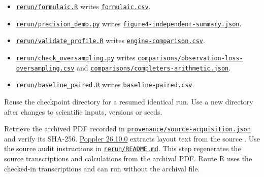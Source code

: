 \begin{description}
\begin{itemize}
\item \href{https://github.com/alectionary/vibe-math/blob/master/formalization/kupzyk-power-assumptions/rerun/formulaic.R}{\nolinkurl{rerun/formulaic.R}} writes \href{https://github.com/alectionary/vibe-math/blob/master/formalization/kupzyk-power-assumptions/results/full/formulaic.csv}{\nolinkurl{formulaic.csv}}.
\item \href{https://github.com/alectionary/vibe-math/blob/master/formalization/kupzyk-power-assumptions/rerun/precision_demo.py}{\nolinkurl{rerun/precision_demo.py}} writes \href{https://github.com/alectionary/vibe-math/blob/master/formalization/kupzyk-power-assumptions/results/figure4-independent-summary.json}{\nolinkurl{figure4-independent-summary.json}}.
\item \href{https://github.com/alectionary/vibe-math/blob/master/formalization/kupzyk-power-assumptions/rerun/validate_profile.R}{\nolinkurl{rerun/validate_profile.R}} writes \href{https://github.com/alectionary/vibe-math/blob/master/formalization/kupzyk-power-assumptions/results/engine-comparison.csv}{\nolinkurl{engine-comparison.csv}}.
\item \href{https://github.com/alectionary/vibe-math/blob/master/formalization/kupzyk-power-assumptions/rerun/check_oversampling.py}{\nolinkurl{rerun/check_oversampling.py}} writes \href{https://github.com/alectionary/vibe-math/blob/master/formalization/kupzyk-power-assumptions/results/full/observation-loss-oversampling.csv}{\nolinkurl{comparisons/observation-loss-oversampling.csv}} and \href{https://github.com/alectionary/vibe-math/blob/master/formalization/kupzyk-power-assumptions/results/full/completers-arithmetic.json}{\nolinkurl{comparisons/completers-arithmetic.json}}.
\item \href{https://github.com/alectionary/vibe-math/blob/master/formalization/kupzyk-power-assumptions/rerun/baseline_paired.R}{\nolinkurl{rerun/baseline_paired.R}} writes \href{https://github.com/alectionary/vibe-math/blob/master/formalization/kupzyk-power-assumptions/results/full/baseline-paired.csv}{\nolinkurl{baseline-paired.csv}}.
\end{itemize}

Reuse the checkpoint directory for a resumed identical run. Use a new directory after changes to scientific inputs, versions or seeds.
\item[S, source measurements.] Retrieve the archived PDF recorded in \href{https://github.com/alectionary/vibe-math/blob/master/formalization/kupzyk-power-assumptions/provenance/source-acquisition.json}{\nolinkurl{provenance/source-acquisition.json}} and verify its SHA-256. \href{https://poppler.freedesktop.org/}{Poppler 26.10.0} extracts layout text from the source \citep{poppler2026}. Use the source audit instructions in \href{https://github.com/alectionary/vibe-math/blob/master/formalization/kupzyk-power-assumptions/rerun/README.md}{\nolinkurl{rerun/README.md}}. This step regenerates the source transcriptions and calculations from the archival PDF. Route R uses the checked-in transcriptions and can run without the archival file.
\end{description}

